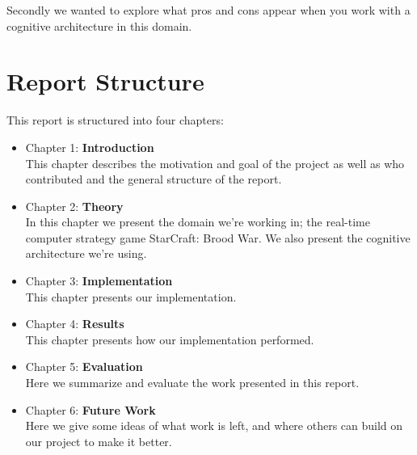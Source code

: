 Secondly we wanted to explore what pros and cons appear when you work with a cognitive architecture in this domain.

\section{Report Structure}
\label{sec:structure}
This report is structured into four chapters:
\begin{itemize}
\item Chapter 1: \textbf{Introduction} \\
This chapter describes the motivation and goal of the project as well as who
contributed and the general structure of the report.
\item Chapter 2: \textbf{Theory} \\
In this chapter we present the domain we're working in; the real-time computer strategy game StarCraft: Brood War. We also present the cognitive architecture we're using.
\item Chapter 3: \textbf{Implementation} \\
This chapter presents our implementation.
\item Chapter 4: \textbf{Results} \\
This chapter presents how our implementation performed.
\item Chapter 5: \textbf{Evaluation} \\
Here we summarize and evaluate the work presented in this report.
\item Chapter 6: \textbf{Future Work} \\
Here we give some ideas of what work is left, and where others can build on our project to make it better.

\end{itemize}